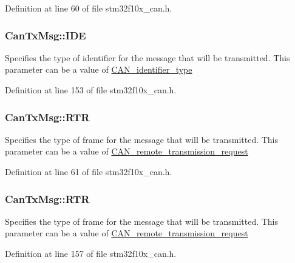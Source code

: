 Definition at line 60 of file stm32f10x\+\_\+can.\+h.

\subsubsection[{\texorpdfstring{I\+DE}{IDE}}]{ Can\+Tx\+Msg\+::\+I\+DE}\hypertarget{struct_can_tx_msg_aa4c8568a0e3250a17bd7e116b3e09670}{}\label{struct_can_tx_msg_aa4c8568a0e3250a17bd7e116b3e09670}
Specifies the type of identifier for the message that will be transmitted. This parameter can be a value of \hyperlink{group___c_a_n__identifier__type}{C\+A\+N\+\_\+identifier\+\_\+type} 

Definition at line 153 of file stm32f10x\+\_\+can.\+h.

\subsubsection[{\texorpdfstring{R\+TR}{RTR}}]{ Can\+Tx\+Msg\+::\+R\+TR}\hypertarget{struct_can_tx_msg_a34fa45f54662c61785a06cf5294ffbb5}{}\label{struct_can_tx_msg_a34fa45f54662c61785a06cf5294ffbb5}
Specifies the type of frame for the message that will be transmitted. This parameter can be a value of \hyperlink{group___c_a_n__remote__transmission__request}{C\+A\+N\+\_\+remote\+\_\+transmission\+\_\+request} 

Definition at line 61 of file stm32f10x\+\_\+can.\+h.

\subsubsection[{\texorpdfstring{R\+TR}{RTR}}]{ Can\+Tx\+Msg\+::\+R\+TR}\hypertarget{struct_can_tx_msg_a69f84255db38c6910058f290efdb7302}{}\label{struct_can_tx_msg_a69f84255db38c6910058f290efdb7302}
Specifies the type of frame for the message that will be transmitted. This parameter can be a value of \hyperlink{group___c_a_n__remote__transmission__request}{C\+A\+N\+\_\+remote\+\_\+transmission\+\_\+request} 

Definition at line 157 of file stm32f10x\+\_\+can.\+h.

